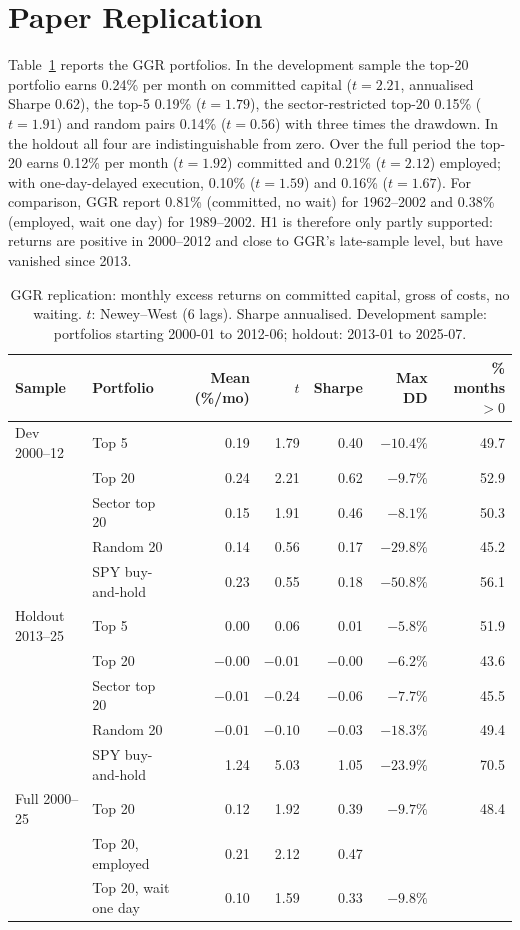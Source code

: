 \documentclass[11pt]{article}
\begin{document}
\section{Paper Replication}
\label{sec:replication}

Table~\ref{tab:replication} reports the GGR portfolios. In the development sample the top-20 portfolio earns 0.24\% per month on committed capital ($t=2.21$, annualised Sharpe 0.62), the top-5 0.19\% ($t=1.79$), the sector-restricted top-20 0.15\% ($t=1.91$) and random pairs 0.14\% ($t=0.56$) with three times the drawdown. In the holdout all four are indistinguishable from zero. Over the full period the top-20 earns 0.12\% per month ($t=1.92$) committed and 0.21\% ($t=2.12$) employed; with one-day-delayed execution, 0.10\% ($t=1.59$) and 0.16\% ($t=1.67$). For comparison, GGR report 0.81\% (committed, no wait) for 1962--2002 and 0.38\% (employed, wait one day) for 1989--2002. H1 is therefore only partly supported: returns are positive in 2000--2012 and close to GGR's late-sample level, but have vanished since 2013.

\begin{table}[t]\centering\small
\caption{GGR replication: monthly excess returns on committed capital, gross of costs, no waiting. $t$: Newey--West (6 lags). Sharpe annualised. Development sample: portfolios starting 2000-01 to 2012-06; holdout: 2013-01 to 2025-07.}
\label{tab:replication}
\begin{tabular}{llrrrrr}
\toprule
Sample & Portfolio & Mean (\%/mo) & $t$ & Sharpe & Max DD & \% months $>0$ \\
\midrule
Dev 2000--12 & Top 5 & 0.19 & 1.79 & 0.40 & $-10.4\%$ & 49.7 \\
 & Top 20 & 0.24 & 2.21 & 0.62 & $-9.7\%$ & 52.9 \\
 & Sector top 20 & 0.15 & 1.91 & 0.46 & $-8.1\%$ & 50.3 \\
 & Random 20 & 0.14 & 0.56 & 0.17 & $-29.8\%$ & 45.2 \\
 & SPY buy-and-hold & 0.23 & 0.55 & 0.18 & $-50.8\%$ & 56.1 \\
\midrule
Holdout 2013--25 & Top 5 & 0.00 & 0.06 & 0.01 & $-5.8\%$ & 51.9 \\
 & Top 20 & $-0.00$ & $-0.01$ & $-0.00$ & $-6.2\%$ & 43.6 \\
 & Sector top 20 & $-0.01$ & $-0.24$ & $-0.06$ & $-7.7\%$ & 45.5 \\
 & Random 20 & $-0.01$ & $-0.10$ & $-0.03$ & $-18.3\%$ & 49.4 \\
 & SPY buy-and-hold & 1.24 & 5.03 & 1.05 & $-23.9\%$ & 70.5 \\
\midrule
Full 2000--25 & Top 20 & 0.12 & 1.92 & 0.39 & $-9.7\%$ & 48.4 \\
 & Top 20, employed & 0.21 & 2.12 & 0.47 & & \\
 & Top 20, wait one day & 0.10 & 1.59 & 0.33 & $-9.8\%$ & \\
\bottomrule
\end{tabular}
\end{table}
\end{document}

